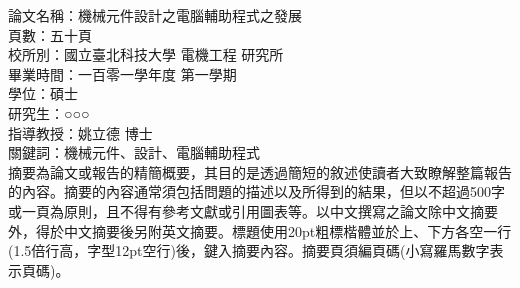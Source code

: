 \begin{abstractCH}

\noindent
論文名稱：機械元件設計之電腦輔助程式之發展\\
頁數：五十頁\\
校所別：國立臺北科技大學 電機工程  研究所\\
畢業時間：一百零一學年度 第一學期\\
學位：碩士\\
研究生：○○○\\
指導教授：姚立德 博士\\

\noindent
關鍵詞：機械元件、設計、電腦輔助程式\\

摘要為論文或報告的精簡概要，其目的是透過簡短的敘述使讀者大致瞭解整篇報告的內容。摘要的內容通常須包括問題的描述以及所得到的結果，但以不超過500字或一頁為原則，且不得有參考文獻或引用圖表等。以中文撰寫之論文除中文摘要外，得於中文摘要後另附英文摘要。標題使用20pt粗標楷體並於上、下方各空一行(1.5倍行高，字型12pt空行)後，鍵入摘要內容。摘要頁須編頁碼(小寫羅馬數字表示頁碼)。

\end{abstractCH}

